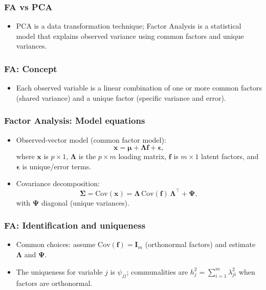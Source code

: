 \documentclass{beamer}
\begin{document}
\begin{frame}
    \frametitle{FA vs PCA}
    \begin{itemize}
        \item PCA is a data transformation technique; Factor Analysis is a statistical model that explains observed variance using common factors and unique variances.
    \end{itemize}
\end{frame}

\begin{frame}
    \frametitle{FA: Concept}
    \begin{itemize}
        \item Each observed variable is a linear combination of one or more common factors (shared variance) and a unique factor (specific variance and error).
    \end{itemize}
\end{frame}

\begin{frame}
    \frametitle{Factor Analysis: Model equations}
    \begin{itemize}
        \item Observed-vector model (common factor model):
        \[\mathbf{x}=\boldsymbol{\mu}+\mathbf{\Lambda}\mathbf{f}+\boldsymbol{\epsilon},\]
        where $\mathbf{x}$ is $p\times 1$, $\mathbf{\Lambda}$ is the $p\times m$ loading matrix, $\mathbf{f}$ is $m\times1$ latent factors, and $\boldsymbol{\epsilon}$ is unique/error terms.
        \item Covariance decomposition:
        \[\boldsymbol{\Sigma}=\mathrm{Cov}(\mathbf{x})=\mathbf{\Lambda}\,\mathrm{Cov}(\mathbf{f})\,\mathbf{\Lambda}^\top+\boldsymbol{\Psi},\]
        with $\boldsymbol{\Psi}$ diagonal (unique variances).
    \end{itemize}
\end{frame}

\begin{frame}
    \frametitle{FA: Identification and uniqueness}
    \begin{itemize}
        \item Common choices: assume $\mathrm{Cov}(\mathbf{f})=\mathbf{I}_m$ (orthonormal factors) and estimate $\mathbf{\Lambda}$ and $\boldsymbol{\Psi}$.
        \item The uniqueness for variable $j$ is $\psi_{jj}$; communalities are $h_j^2=\sum_{i=1}^m\lambda_{ji}^2$ when factors are orthonormal.
    \end{itemize}
\end{frame}
\end{document}
